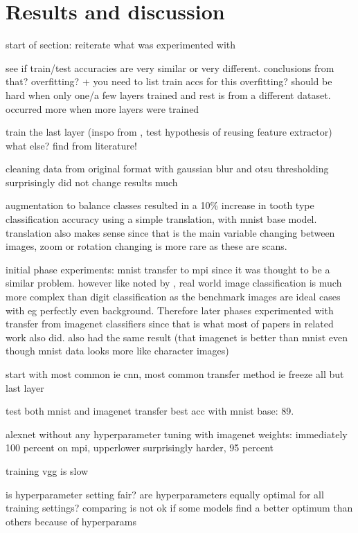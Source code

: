 \documentclass{article}
\begin{document}
\section{Results and discussion}


start of section: reiterate what was experimented with

see if train/test accuracies are very similar or very different. conclusions from that? overfitting? + you need to list train accs for this
overfitting? should be hard when only one/a few layers trained and rest is from a different dataset.
occurred more when more layers were trained

train the last layer (inspo from \cite{tibetan_ocr}, test hypothesis of reusing feature extractor)
what else? find from literature!

cleaning data from original format with gaussian blur and otsu thresholding surprisingly did not 
change results much 

augmentation to balance classes resulted in a 10\% increase in tooth type classification accuracy 
using a simple translation, with mnist base model. translation also makes sense since that is the main variable changing 
between images, zoom or rotation changing is more rare as these are scans.

initial phase experiments: mnist transfer to mpi since it was thought to be a similar problem. 
however like noted by \cite{alexnet}, real world image classification is much more complex than digit classification 
as the benchmark images are ideal cases with eg perfectly even background. Therefore later phases 
experimented with transfer from imagenet classifiers since that is what most of papers in related work also did.
also \cite{8goelGujarati2023} had the same result (that imagenet is better than mnist even though mnist data looks more like character images)

start with most common ie cnn, most common transfer method ie freeze all but last layer 

test both mnist and imagenet transfer 
best acc with mnist base: 89.

alexnet without any hyperparameter tuning with imagenet weights: immediately 100 percent on mpi,
upperlower surprisingly harder, 95 percent

training vgg is slow

is hyperparameter setting fair? are hyperparameters equally optimal for all training settings? comparing is not ok if some models find a better optimum than others because of hyperparams
\end{document}
